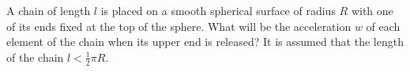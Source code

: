 \item A chain of length \( l \) is placed on a smooth spherical surface of radius \( R \) with one of its ends fixed at the top of the sphere. What will be the acceleration \( w \) of each element of the chain when its upper end is released? It is assumed that the length of the chain \( l < \frac{1}{2} \pi R \).
